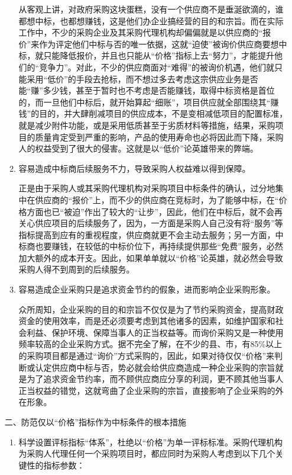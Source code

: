 \begin{enumerate}
\begin{enumerate}
        从客观上讲，对政府采购这块蛋糕，没有一个供应商不是垂涎欲滴的，谁都想中标，也都想赚钱，这是他们办企业搞经营的目的和宗旨。而在实际工作中，不少的采购企业及其采购代理机构却偏偏就是以供应商的“报价”来作为评定他们中标与否的唯一依据，这就“迫使”被询价供应商要想中标，就只能降低报价，并且也只能从“价格”指标上去“努力”，才能提升他们的“竞争力”。对此，不少的供应商面对“难得”的被询价机遇，他们就只能采用“低价”的手段去抢标，而不想过多去考虑这宗供应业务是否能“赚”多少钱，甚至于暂时也不考虑是否能赚钱，取得中标资格是首位的，而一旦他们中标后，就开始算起“细账”，项目供应就全部围绕其“赚钱”的目的，并大肆削减项目的供应成本，不是变相减低项目的配置标准，就是减少附件功能，或是采用低质甚至于劣质材料等措施，结果，采购项目的质量肯定受到严重的影响，产品的使用寿命也必将因此而下降，采购人的权益受到了很大的侵害。这就是以“低价”论英雄带来的弊端。

        \item  容易造成中标商后续服务不力，导致采购人权益难以得到保障。

        正是由于采购人或其采购代理机构对采购项目中标条件的确认，过分地集中在供应商的“报价”上，而不少的供应商在竞标时，为了能够中标，在“价格方面也已“被迫”作出了较大的“让步”，因此，他们在中标后，就不会再关心供应项目的后续服务了，因为，一方面是采购人自己没有将“服务”等指标提高到应有的重视程度，供应商就更不会主动去服务；另一方面，中标商也要赚钱，在较低的中标价位下，再持续提供那些“免费”服务，必然加大额外的成本开支。因此，如果单单就以“价格”论英雄，就必然会导致采购人得不到周到的后续服务。

        \item  容易造成企业采购只是追求资金节约的假象，进而影响企业采购形象。

        众所周知，企业采购的目的和宗旨不仅仅是为了节约采购资金，提高财政资金的使用效率，而是还必须要考虑到其他诸多的因素，如维护国家和社会利益、保护环境、保障当事人的正当权益等。而询价采购又是一种使用频率较高的企业采购方式。据不完全了解，在不少的县、市，有85\%以上的采购项目都是通过“询价”方式采购的，因此，如果对待仅仅“价格”来判断或认定供应商中标与否，势必就会给供应商造成一种企业采购的宗旨就是为了追求资金节约率，而不顾供应商应分享的利润，更不顾其他当事人正当权益的错觉，这就弯曲了企业采购的宗旨，直接影响了企业采购的外在形象。
    \end{enumerate}

    二、防范仅以“价格”指标作为中标条件的根本措施

    \begin{enumerate}
        \item  科学设置评标指标“体系”，杜绝以“价格”为单一评标标准。采购代理机构为采购人代理任何一个采购项目时，都应同时为采购人考虑到以下几个关键性的指标参数：


\end{enumerate}
\end{enumerate}

